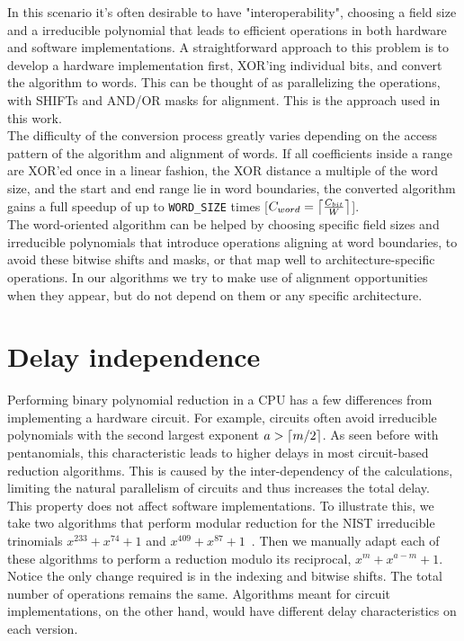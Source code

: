 In this scenario it's often desirable to have "interoperability", choosing a field size and a irreducible polynomial that leads to efficient operations in both hardware and software implementations. A straightforward approach to this problem is to develop a hardware implementation first, XOR'ing individual bits, and convert the algorithm to words. This can be thought of as parallelizing the operations, with SHIFTs and AND/OR masks for alignment. This is the approach used in this work. \\

The difficulty of the conversion process greatly varies depending on the access pattern of the algorithm and alignment of words. If all coefficients inside a range are XOR'ed once in a linear fashion, the XOR distance a multiple of the word size, and the start and end range lie in word boundaries, the converted algorithm gains a full speedup of up to \texttt{WORD\_SIZE} times {[}$C_{word} = \ceil*{\frac{C_{bit}}{W}}${]}. \\

The word-oriented algorithm can be helped by choosing specific field sizes and irreducible polynomials that introduce operations aligning at word boundaries, to avoid these bitwise shifts and masks, or that map well to architecture-specific operations. In our algorithms we try to make use of alignment opportunities when they appear, but do not depend on them or any specific architecture. \\

\section{Delay independence}\label{delay-independence}

Performing binary polynomial reduction in a CPU has a few differences from implementing a hardware circuit. For example, circuits often avoid irreducible polynomials with the second largest exponent $a > \ceil{m/2}$. As seen before with pentanomials, this characteristic leads to higher delays in most circuit-based reduction algorithms. This is caused by the inter-dependency of the calculations, limiting the natural parallelism of circuits and thus increases the total delay. \\

This property does not affect software implementations. To illustrate this, we take two algorithms that perform modular reduction for the NIST irreducible trinomials $x^{233} + x^{74} + 1$ and $x^{409} + x^{87} + 1$~\cite[p. 55]{hankerson2006guide}. Then we manually adapt each of these algorithms to perform a reduction modulo its reciprocal, $x^m + x^{a-m} + 1$. Notice the only change required is in the indexing and bitwise shifts. The total number of operations remains the same. Algorithms meant for circuit implementations, on the other hand, would have different delay characteristics on each version. \\ %

